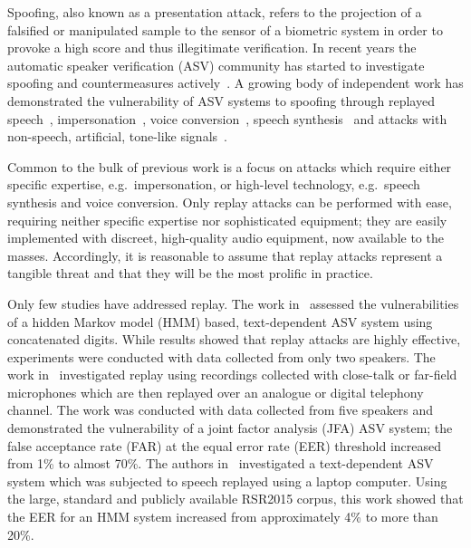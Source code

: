 
Spoofing, also known as a presentation attack, refers to the projection of a falsified or manipulated sample 
to the sensor of a biometric system in order to provoke a high score and 
thus illegitimate verification.
In recent years the automatic speaker verification (ASV) community has 
started to investigate spoofing and countermeasures 
actively~\cite{interspeechSpecialSession, Wu2014a}. 
A growing 
body of independent work has demonstrated the vulnerability of ASV 
systems to spoofing through 
replayed speech~\cite{Lindberg1999,Villalba2010},
impersonation~\cite{Blomberg2004,Farrus2008}, voice 
conversion~\cite{Perrot2005, Pellom1999}, speech 
synthesis~\cite{Masuko1999, Leon2010} and attacks with non-speech, 
artificial, tone-like signals~\cite{Alegre2012a,Alegre2012b}.

Common to the bulk of previous work is a focus on attacks 
which require either specific expertise, e.g.~impersonation, or high-level 
technology, e.g.~speech synthesis and voice conversion. 
Only replay attacks can be performed with ease, requiring neither specific 
expertise nor sophisticated equipment; they are easily 
implemented %
with discreet, high-quality audio equipment, now available to the masses.
Accordingly, it is reasonable to assume that replay attacks represent a tangible threat and that they will be the most prolific
in practice.  
%

Only few studies have addressed replay.  
The work in~\cite{Lindberg1999} assessed the vulnerabilities of a hidden Markov model (HMM) based, text-dependent ASV system using concatenated digits.  
While results showed that replay attacks are highly effective, experiments were conducted with data collected from only two speakers.
The work in~\cite{Villalba2010} investigated replay using recordings collected with close-talk or far-field microphones which are then replayed over an analogue or digital telephony channel. 
The work was conducted with data collected from five speakers and demonstrated the vulnerability of a joint factor analysis (JFA) ASV system; the false acceptance rate (FAR) at the equal error rate (EER) threshold increased from 1\% to almost 70\%. 
The authors in~\cite{Wu2014} investigated a text-dependent 
ASV system which was subjected to speech replayed using a laptop computer. 
Using the large, standard and publicly available RSR2015 corpus, this work showed that the EER for an HMM system increased from approximately 4\% to more than 20\%. %

